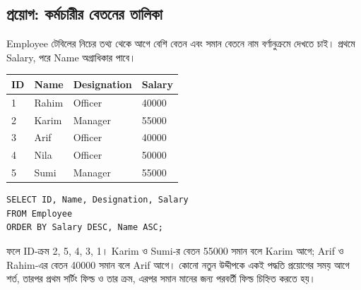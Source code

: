 \subsection{প্রয়োগ: কর্মচারীর বেতনের তালিকা}
Employee টেবিলের নিচের তথ্য থেকে আগে বেশি বেতন এবং সমান বেতনে নাম বর্ণানুক্রমে দেখতে চাই। প্রথমে Salary, পরে Name অগ্রাধিকার পাবে।
\begin{chSixSideBySide}[.48]
\small
\begin{tabular}{|l|l|l|l|}\hline
ID & Name & Designation & Salary\\\hline
1 & Rahim & Officer & 40000\\\hline2 & Karim & Manager & 55000\\\hline
3 & Arif & Officer & 40000\\\hline4 & Nila & Officer & 50000\\\hline
5 & Sumi & Manager & 55000\\\hline
\end{tabular}
\chSixNextColumn
\begin{verbatim}
SELECT ID, Name, Designation, Salary
FROM Employee
ORDER BY Salary DESC, Name ASC;
\end{verbatim}
\end{chSixSideBySide}
ফলে ID-ক্রম 2, 5, 4, 3, 1। Karim ও Sumi-র বেতন 55000 সমান বলে Karim আগে; Arif ও Rahim-এর বেতন 40000 সমান বলে Arif আগে। কোনো নতুন উদ্দীপকে একই পদ্ধতি প্রয়োগের সময় আগে শর্ত, তারপর প্রথম সর্টিং ফিল্ড ও তার ক্রম, এরপর সমান মানের জন্য পরবর্তী ফিল্ড চিহ্নিত করতে হয়।

